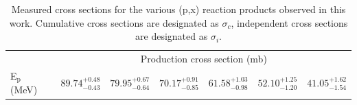 \begin{table}
\centering
\caption{Measured cross sections for the various (p,x) reaction products observed in this work. Cumulative cross sections are designated as $\sigma_c$, independent cross sections are designated as $\sigma_i$.}
\label{tab:cufe_rp_table}
\small
\begin{tabular}{@{}lllllll@{}}
\toprule
                            & \multicolumn{6}{c}{Production cross section (mb)}                                                                                                         \\ \cmidrule(l){2-7} 
E$_\text{p}$ (MeV)          & $89.74^{+0.48}_{-0.43}$ & $79.95^{+0.67}_{-0.64}$ & $70.17^{+0.91}_{-0.85}$ & $61.58^{+1.03}_{-0.98}$ & $52.10^{+1.25}_{-1.20}$ & $41.05^{+1.62}_{-1.54}$ \\ \midrule

\end{tabular}
\end{table}
